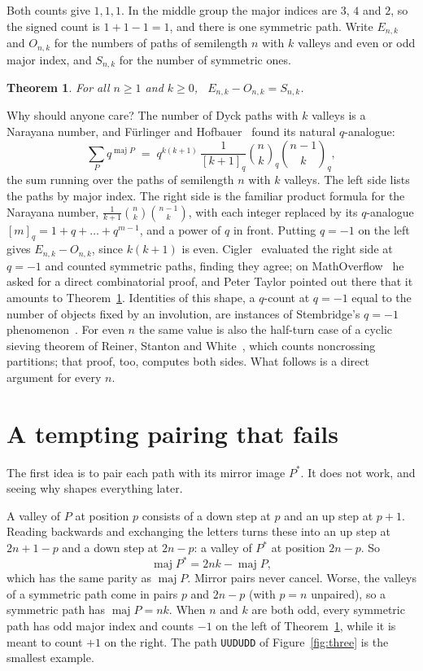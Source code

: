 \documentclass[11pt]{article}
\newtheorem{theorem}{Theorem}
\theoremstyle{remark}
\newcommand{\maj}{\operatorname{maj}}
\newcommand{\w}[1]{\texttt{#1}}
\begin{document}
Both counts give $1, 1, 1$. In the middle group the major indices are $3$, $4$ and $2$, so the
signed count is $1+1-1=1$, and there is one symmetric path. Write $E_{n,k}$ and $O_{n,k}$ for
the numbers of paths of semilength $n$ with $k$ valleys and even or odd major index, and
$S_{n,k}$ for the number of symmetric ones.

\begin{theorem}\label{thm:main}
For all $n\ge 1$ and $k\ge 0$, \ $E_{n,k}-O_{n,k}=S_{n,k}$.
\end{theorem}

Why should anyone care? The number of Dyck paths with $k$ valleys is a Narayana number, and
F\"urlinger and Hofbauer~\cite{FH} found its natural $q$-analogue:
\begin{equation}\label{eq:FH}
\sum_{P}q^{\maj P}\;=\;q^{k(k+1)}\,\frac{1}{[k+1]_q}\binom{n}{k}_{\!q}\binom{n-1}{k}_{\!q},
\end{equation}
the sum running over the paths of semilength $n$ with $k$ valleys. The left side lists the
paths by major index. The right side is the familiar product formula for the Narayana number,
$\frac{1}{k+1}\binom{n}{k}\binom{n-1}{k}$, with each integer replaced by its $q$-analogue
$[m]_q=1+q+\dots+q^{m-1}$, and a power of $q$ in front. Putting $q=-1$ on the left gives
$E_{n,k}-O_{n,k}$, since $k(k+1)$ is even. Cigler~\cite{Cig26} evaluated the right side at $q=-1$
and counted symmetric paths, finding they agree; on MathOverflow~\cite{MO} he asked for a direct
combinatorial proof, and Peter Taylor pointed out there that it amounts to Theorem~\ref{thm:main}.
Identities of this shape, a $q$-count at $q=-1$ equal to the number of objects fixed by an
involution, are instances of Stembridge's $q=-1$ phenomenon~\cite{Stem}. For even $n$ the same
value is also the half-turn case of a cyclic sieving theorem of Reiner, Stanton and
White~\cite[Theorem 7.2]{RSW}, which counts noncrossing partitions; that proof, too, computes both
sides. What follows is a direct argument for every $n$.

\section{A tempting pairing that fails}

The first idea is to pair each path with its mirror image $P^*$. It does not work, and seeing
why shapes everything later.

A valley of $P$ at position $p$ consists of a down step at $p$ and an up step at $p+1$. Reading
backwards and exchanging the letters turns these into an up step at $2n+1-p$ and a down step at
$2n-p$: a valley of $P^*$ at position $2n-p$. So
\[
\maj P^*=2nk-\maj P,
\]
which has the same parity as $\maj P$. Mirror pairs never cancel. Worse, the valleys of a
symmetric path come in pairs $p$ and $2n-p$ (with $p=n$ unpaired), so a symmetric path has
$\maj P=nk$. When $n$ and $k$ are both odd, every symmetric path has odd major index and counts
$-1$ on the left of Theorem~\ref{thm:main}, while it is meant to count $+1$ on the right. The path
\w{UUDUDD} of Figure~\ref{fig:three} is the smallest example.
\end{document}

